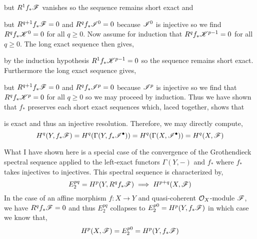 \documentclass[12pt]{article}
\begin{document}
but $R^1 f_* \mathscr{F}$ vanishes so the sequence remains short exact and 
\begin{center}
\end{center}
but $R^{q+1} f_* \mathscr{F} = 0$ and $R^q f_* \mathscr{I}^0 = 0$ because $\mathscr{I}^0$ is injective so we find $R^q f_* \mathscr{K}^0 = 0$ for all $q \ge 0$. Now assume for induction that $R^q f_* \mathscr{K}^{p - 1} = 0$ for all $q \ge 0$. The long exact sequence then gives,
\begin{center}
\end{center}
by the induction hypothesis $R^1 f_* \mathscr{K}^{p - 1} = 0$ so the sequence remains short exact. Furthermore the long exact sequence gives,
\begin{center}
\end{center}
but $R^{q+1} f_* \mathscr{F} = 0$ and $R^q f_* \mathscr{I}^p = 0$ because $\mathscr{I}^p$ is injective so we find that $R^q f_* \mathscr{K}^p = 0$ for all $q \ge 0$ so we may proceed by induction. Thus we have shown that $f_*$ preserves each short exact sequences which, laced together, shows that
\begin{center}
\end{center}
is exact and thus an injective resolution. Therefore, we may directly compute,
\[ H^q(Y, f_* \mathscr{F}) = H^q(\Gamma(Y, f_* \mathscr{I}^\bullet)) = H^q(\Gamma(X, \mathscr{I}^\bullet)) = H^q(X, \mathscr{F}) \]

\begin{remark}
What I have shown here is a special case of the convergence of the Grothendieck spectral sequence applied to the left-exact functors $\Gamma(Y, -)$ and $f_*$ where $f_*$ takes injectives to injectives. This spectral sequence is characterized by,
\[ E^{pq}_2 = H^p(Y, R^q f_* \mathscr{F}) \implies H^{p+q}(X, \mathscr{F}) \] 
In the case of an affine morphism $f : X \to Y$ and quasi-coherent $\mathcal{O}_{X}$-module $\mathscr{F}$, we have $R^q f_* \mathscr{F} = 0$ and thus $E^{pq}_2$ collapses to $E_2^{p0} = H^p(Y, f_* \mathscr{F})$ in which case we know that,
\[ H^p(X, \mathscr{F}) = E^{p0}_2 = H^p(Y, f_* \mathscr{F}) \]
\end{remark}
\end{document}
